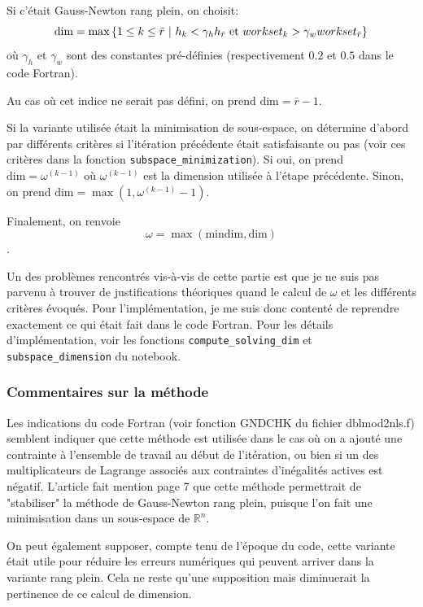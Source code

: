 \documentclass[a4paper,11pt]{article}
\newcommand{\real}{\mathbb{R}}
\numberwithin{equation}{section}
\begin{document}
Si c'était Gauss-Newton rang plein, on choisit:
$$
\text{dim}= \max \left\{ 1\leq k \leq \bar{r}\ | \ h_{k} < \gamma_{h}h_{\bar{r}} \text{ et } workset_{k} > \gamma_{w}workset_{\bar{r}} \right\}
$$
où $\gamma_{h}$ et $\gamma_{w}$ sont des constantes pré-définies (respectivement $0.2$ et $0.5$ dans le code Fortran).

Au cas où cet indice ne serait pas défini, on prend $\text{dim}=\bar{r}-1$.

Si la variante utilisée était la minimisation de sous-espace, on détermine d'abord par différents critères si l'itération précédente était satisfaisante ou pas (voir ces critères dans la fonction \texttt{subspace\_minimization}). Si oui, on prend  $\text{dim}=\omega^{(k-1)}$ où $\omega^{(k-1)}$ est la dimension utilisée à l'étape précédente. Sinon, on prend $\text{dim}=\max(1,\omega^{(k-1)}-1)$.

Finalement, on renvoie
$$\omega = \max(\text{mindim},\text{dim})$$.
 
 
Un des problèmes rencontrés vis-à-vis de cette partie est que je ne suis pas parvenu à trouver de justifications théoriques quand le calcul de $\omega$ et les différents critères évoqués. Pour l'implémentation, je me suis donc contenté de reprendre exactement ce qui était fait dans le code Fortran. Pour les détails d'implémentation, voir les fonctions \texttt{compute\_solving\_dim} et \texttt{subspace\_dimension} du notebook.


\subsubsection{Commentaires sur la méthode}

Les indications du code Fortran (voir fonction GNDCHK du fichier dblmod2nls.f) semblent indiquer que cette méthode est utilisée dans le cas où on a ajouté une contrainte à l'ensemble de travail au début de l'itération, ou bien si un des multiplicateurs de Lagrange associés aux contraintes d'inégalités actives est négatif. L'article \cite{lindstromwedin1988} fait mention page 7 que cette méthode permettrait de "stabiliser" la méthode de Gauss-Newton rang plein, puisque l'on fait une minimisation dans un sous-espace de $\real^{n}$. 

On peut également supposer, compte tenu de l'époque du code, cette variante était utile pour réduire les erreurs numériques qui peuvent arriver dans la variante rang plein. Cela ne reste qu'une supposition mais diminuerait la pertinence de ce calcul de dimension.
\end{document}

